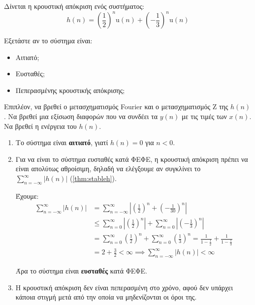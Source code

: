 \documentclass[11pt,a4paper,notitlepage,fleqn,draft]{article}
\begin{document}
\begin{exercise}
	Δίνεται η κρουστική απόκριση ενός συστήματος:
	\[
	h(n) = \left(\frac{1}{2}\right)^n \mathrm{u}(n) + \left(-\frac{1}{3}\right)^n \mathrm{u}(n)
	\]
	
	Εξετάστε αν το σύστημα είναι:
	\begin{itemize}
		\item Αιτιατό;
		\item Ευσταθές;
		\item Πεπερασμένης κρουστικής απόκρισης;
	\end{itemize}

   Επιπλέον, να βρεθεί ο μετασχηματισμός Fourier και ο μετασχηματισμός Z της \( h(n) \). Να βρεθεί μια εξίσωση διαφορών που να συνδέει τα \( y(n) \) με τις τιμές των \( x(n) \). Να βρεθεί η ενέργεια
   του \( h(n) \).

    \tcblower
    \begin{enumerate}
    	\item Το σύστημα είναι \textbf{αιτιατό}, γιατί \( h(n) = 0 \) για \( n<0 \).
    	\item Για να είναι το σύστημα ευσταθές κατά ΦΕΦΕ, η κρουστική απόκριση πρέπει να είναι απολύτως αθροίσιμη, δηλαδή να ελέγξουμε αν συγκλίνει το \( \sum_{n=-\infty}^{\infty} \left|h(n)\right| \) (\autoref{thm:stableh}).
    	
    	Έχουμε:
    	\begin{align*}
    		\sum_{n=-\infty}^{\infty} \left|h(n)\right|
    		&= \sum_{n=-\infty}^{\infty}\left| \left(\frac{1}{2}\right)^n + \left(-\frac{1}{30}\right)^{n}
    		\right|
    		\\ &\leq \sum_{n=0}^{\infty} \left|\left(\frac{1}{2}\right)^n\right|
    		+ \sum_{n=0}^{\infty} \left|
    		\left(-\frac{1}{3}\right)^n
    		\right|
    		\\ &= \sum_{n=0}^{\infty} \left(\frac{1}{2}\right)^n
    		+ \sum_{n=0}^{\infty} \left(\frac{1}{3}\right)^n
    		= \frac{1}{1-\frac{1}{2}}+\frac{1}{1-\frac{1}{3}}
    		\\ &= 2+\frac{3}{2} < \infty \implies \sum_{n=-\infty}^{\infty} \left|h(n)\right|<\infty
    	\end{align*}
    	
    	Άρα το σύστημα είναι \textbf{ευσταθές} κατά ΦΕΦΕ.
    	\item
    	Η κρουστική απόκριση δεν είναι πεπερασμένη στο χρόνο, αφού δεν υπάρχει κάποια στιγμή μετά από
    	την οποία να μηδενίζονται οι όροι της.
    	

\end{enumerate}
\end{exercise}
\end{document}
